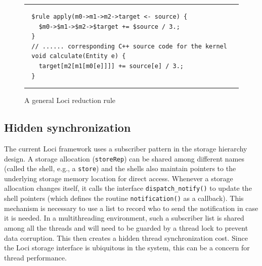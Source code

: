 \documentclass{article}
\begin{document}
\begin{figure}[h]
\noindent\rule{0.85\textwidth}{0.4pt}
\begin{verbatim}
  $rule apply(m0->m1->m2->target <- source) {
    $m0->$m1->$m2->$target += $source / 3.;
  }
  // ...... corresponding C++ source code for the kernel
  void calculate(Entity e) {
    target[m2[m1[m0[e]]]] += source[e] / 3.;
  }
\end{verbatim}
\noindent\rule{0.85\textwidth}{0.4pt}
\caption{A general Loci reduction rule\label{fig:genredux}}
\end{figure}


\subsection{Hidden synchronization}
\label{sec:hiddensync}
The current Loci framework uses a subscriber pattern in the storage
hierarchy design.  A storage allocation (\lstinline{storeRep}) can be
shared among different names (called the shell, e.g., a
\lstinline{store}) and the shells also maintain pointers to the
underlying storage memory location for direct access.  Whenever a
storage allocation changes itself, it calls the interface
\lstinline{dispatch_notify()} to update the shell pointers (which
defines the routine \lstinline{notification()} as a callback).  This
mechanism is necessary to use a list to record who to send the
notification in case it is needed.  In a multithreading environment,
such a subscriber list is shared among all the threads and will need to
be guarded by a thread lock to prevent data corruption.  This then
creates a hidden thread synchronization cost.  Since the Loci storage
interface is ubiquitous in the system, this can be a concern for thread
performance.
\end{document}
